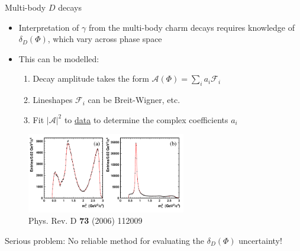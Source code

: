 \documentclass[dvipsnames]{beamer}
\begin{document}
\begin{frame}{Multi-body $D$ decays}
  \begin{itemize}
    \setlength\itemsep{0.5em}
    \item{Interpretation of $\gamma$ from the multi-body charm decays requires knowledge of $\delta_D(\Phi)$, which vary across phase space}
    \item{This can be modelled:}
    \begin{enumerate}
      \item{Decay amplitude takes the form $\mathcal{A}(\Phi) = \sum_ia_i\mathcal{F}_i$}
      \item{Lineshapes $\mathcal{F}_i$ can be Breit-Wigner, etc.}
      \item{Fit $\lvert\mathcal{A}\rvert^2$ to \underline{data} to determine the complex coefficients $a_i$}
    \end{enumerate}
  \end{itemize}
  \begin{figure}
    \centering
    \includegraphics[height = 3.5cm]{Plots/ds2dpi1.pdf}
    \vspace{-0.4cm}
    \caption*{\tiny Phys. Rev. D \textbf{73} (2006) 112009}
  \end{figure}
  \vspace{-0.6cm}
  \begin{center}
    Serious problem: No reliable method for evaluating the $\delta_D(\Phi)$ uncertainty!
  \end{center}
\end{frame}
\end{document}
